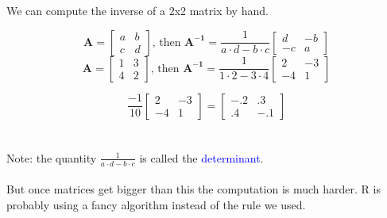 \documentclass[11pt]{beamer}
\begin{document}
\begin{frame}[fragile]

We can compute the inverse of a 2x2 matrix by hand. 

\[
\mathbf{A} = 
\begin{bmatrix}
   a & b\\
   c & d
\end{bmatrix}
\text{, then }
\mathbf{A^{-1}} = 
\dfrac{1}{a \cdot d - b \cdot c}
\begin{bmatrix}
   d & -b\\
   -c & a
\end{bmatrix}
\]
\vspace{5mm}
\[
\mathbf{A} = 
\begin{bmatrix}
   1 & 3\\
   4 & 2
\end{bmatrix}
\text{, then }
\mathbf{A^{-1}} = 
\dfrac{1}{1 \cdot 2 - 3 \cdot 4}
\begin{bmatrix}
   2 & -3\\
   -4 & 1
\end{bmatrix}
\]

\[
\dfrac{-1}{10}
\begin{bmatrix}
   2 & -3\\
   -4 & 1
\end{bmatrix}
=
\begin{bmatrix}
   -.2 & .3\\
   .4 & -.1
\end{bmatrix}
\]
\\~\\

Note: the quantity $\frac{1}{a \cdot d - b \cdot c}$ is called the \textcolor{blue}{determinant}. \\~\\
  
But once matrices get bigger than this the computation is much harder. R is probably using a fancy algorithm instead of the rule we used. 
\end{frame}
\end{document}
